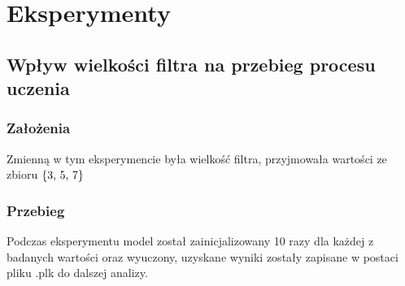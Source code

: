 \documentclass{article}
\begin{document}
\newpage
\section{Eksperymenty}

\subsection{Wpływ wielkości filtra na przebieg procesu uczenia}
\subsubsection*{Założenia}

Zmienną w tym eksperymencie była wielkość filtra, przyjmowała wartości ze zbioru \(\{$3, 5, 7$\}\)
\subsubsection*{Przebieg}

Podczas eksperymentu model został zainicjalizowany 10 razy dla każdej z badanych wartości oraz wyuczony, uzyskane wyniki zostały zapisane w postaci pliku .plk do dalszej analizy.
\end{document}

